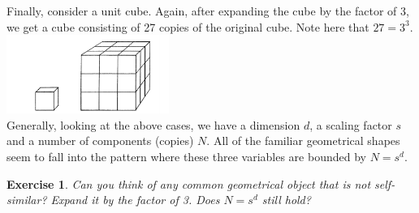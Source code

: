 \documentclass[12pt]{article}
\newtheorem{exercise}{Exercise}
\begin{document}
Finally, consider a unit cube. Again, after expanding the cube by the factor of 3, we get a cube consisting of 27 copies of the original cube. Note here that $27 = 3^3$. \\
\includegraphics[width = 200px]{cube} \\
Generally, looking at the above	 cases, we have a dimension $d$, a scaling factor $s$ and a number of components (copies) $N$. All of the familiar geometrical shapes seem to fall into the pattern where these three variables are bounded by $N = s^d$.

\begin{exercise}
Can you think of any common geometrical object that is not self-similar? Expand it by the factor of 3. Does $N = s^d$ still hold?  
\end{exercise}
\end{document}
